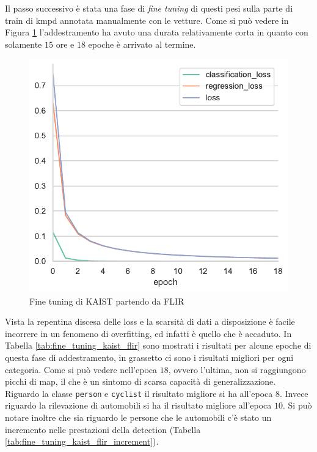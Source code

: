 Il passo successivo è stata una fase di \textit{fine tuning} di questi pesi sulla parte di train di \ac{kmpd} annotata manualmente con le vetture. Come si può vedere in Figura \ref{fig:fine_tuning_kaist_flir} l'addestramento ha avuto una durata relativamente corta in quanto con solamente $15$ ore e $18$ epoche è arrivato al termine.
\begin{figure}[]
    \centering
    \includegraphics[width=\textwidth]{images/graphic/fine_tuning_kaist_flir.pdf}
    \caption{Fine tuning di KAIST partendo da FLIR}
    \label{fig:fine_tuning_kaist_flir}
\end{figure}
Vista la repentina discesa delle loss e la scarsità di dati a disposizione è facile incorrere in un fenomeno di overfitting, ed infatti è quello che è accaduto. In Tabella \ref{tab:fine_tuning_kaist_flir} sono mostrati i risultati per alcune epoche di questa fase di addestramento, in grassetto ci sono i risultati migliori per ogni categoria. Come si può vedere nell'epoca $18$, ovvero l'ultima, non si raggiungono picchi di \ac{map}, il che è un sintomo di scarsa capacità di generalizzazione. Riguardo la classe \texttt{person} e \texttt{cyclist} il risultato migliore si ha all'epoca $8$. Invece riguardo la rilevazione di automobili si ha il risultato migliore all'epoca $10$. Si può notare inoltre che sia riguardo le persone che le automobili c'è stato un incremento nelle prestazioni della detection (Tabella \ref{tab:fine_tuning_kaist_flir_increment}). 

